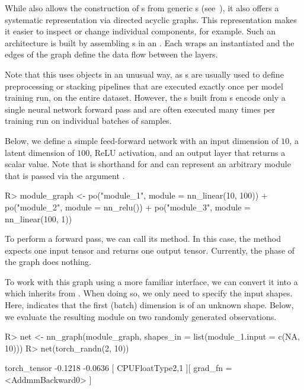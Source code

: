\documentclass[article]{jss}
\theoremstyle{definition}
\begin{document}
While  also allows the construction of s from generic s (see~), it also offers a systematic representation via directed acyclic graphs. This representation makes it easier to inspect or change individual components, for example.
Such an architecture is built by assembling s in an .
Each  wraps an instantiated  and the edges of the graph define the data flow between the layers.

Note that this uses  objects in an unusual way, as
 s are usually used to define preprocessing or stacking pipelines that are executed exactly once per model training run, on the entire dataset.
However, the s built from s encode only a single neural network forward pass and are often executed many times per training run on individual batches of samples.

Below, we define a simple feed-forward network with an input dimension of $10$, a latent dimension of $100$, ReLU activation, and an output layer that returns a scalar value.
Note that  is shorthand for  and can represent an arbitrary \torch{} module that is passed via the argument .

\begin{CodeInput}
R> module_graph <- po("module_1", module = nn_linear(10, 100)) %
+   po("module_2", module = nn_relu()) %
+   po("module_3", module = nn_linear(100, 1))
\end{CodeInput}

To perform a forward pass, we can call its  method.
In this case, the method expects one input tensor and returns one output tensor.
Currently, the  phase of the graph does nothing.

To work with this graph using a more familiar interface, we can convert it into a  which inherits from .
When doing so, we only need to specify the input shapes. Here,  indicates that the first (batch) dimension is of an unknown shape.
Below, we evaluate the resulting module on two randomly generated observations.

\begin{CodeInput}
R> net <- nn_graph(module_graph, shapes_in = list(module_1.input = c(NA, 10)))
R> net(torch_randn(2, 10))
\end{CodeInput}
\begin{CodeOutput}
torch_tensor
-0.1218
-0.0636
[ CPUFloatType{2,1} ][ grad_fn = <AddmmBackward0> ]
\end{CodeOutput}
\end{document}
